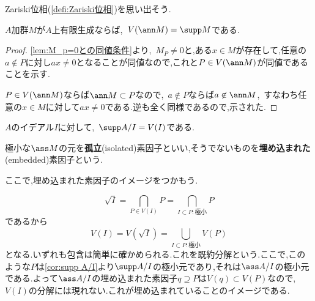 Zariski位相(\ref{defi:Zariski位相})を思い出そう.
\begin{prop}\label{prop:Zariskiの閉集合とsupp}
	$A$加群$M$が$A$上有限生成ならば,~$V(\ann M)=\supp M$である.
\end{prop}
\begin{proof}
	\ref{lem:M_p=0との同値条件}より,~$M_ P\neq0$と,ある$x\in M$が存在して,任意の$a\not\in P$に対し$ax\neq0$となることが同値なので,これと$ P\in V(\ann M)$が同値であることを示す.
	
	$ P\in V(\ann M)$ならば$\ann M\subset P$なので,~$a\not\in P$ならば$a\not\in\ann M$,~すなわち任意の$x\in M$に対して$ax\neq0$である.逆も全く同様であるので,示された.
\end{proof}
\begin{cor}\label{cor:supp A/I}
	$A$のイデアル$I$に対して,~$\supp A/I=V(I)$である.
\end{cor}

\begin{defi}
	極小な$\ass M$の元を\textbf{孤立}(isolated)素因子といい,そうでないものを\textbf{埋め込まれた}(embedded)素因子という.
\end{defi}

ここで,埋め込まれた素因子のイメージをつかもう.

\[\sqrt{I}=\bigcap_{P\in V(I)} P=\bigcap_{I\subset P:\text{極小}} P\]
であるから
\[V(I)=V(\sqrt{I})=\bigcup_{I\subset P:\text{極小}} V( P)\]
となる.いずれも包含は簡単に確かめられる.これを既約分解という.ここで,このような$ P$は\ref{cor:supp A/I}より$\supp A/I$の極小元であり,それは$\ass A/I$の極小元である.よって$\ass A/I$の埋め込まれた素因子$ q\supseteq P$は$V( q)\subset V( P)$なので,~$V(I)$の分解には現れない.これが埋め込まれていることのイメージである.

